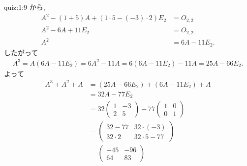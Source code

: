\begin{answerof}{quiz:1:9}
 から,
  \begin{align*}
    A^2-(1+5)A+(1\cdot 5-(-3)\cdot2)E_2&=O_{2,2}\\
    A^2-6A+11E_2&=O_{2,2}\\
    A^2&=6A-11E_2.
  \end{align*}
  したがって
  \begin{align*}
    A^3=A(6A-11E_2)=6A^2-11A=6(6A-11E_2)-11A=25A-66E_2.
  \end{align*}
  よって
  \begin{align*}
    A^3+A^2+A&=(25A-66E_2)+(6A-11E_2)+A\\
    &=32A-77E_2\\
    &=32\begin{pmatrix}1&-3\\2&5\end{pmatrix}-77\begin{pmatrix}1&0\\0&1\end{pmatrix}\\
    &=\begin{pmatrix}32-77&32\cdot(-3)\\32\cdot 2&32\cdot 5-77\end{pmatrix}\\
    &=\begin{pmatrix}-45&-96\\64&83\end{pmatrix}
  \end{align*}


\end{answerof}
